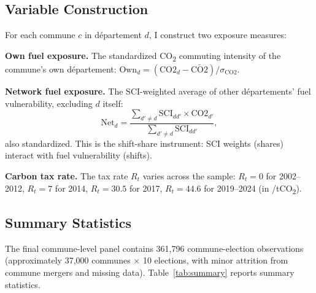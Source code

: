 \documentclass[12pt]{article}
\providecommand{\euro}{\texteuro}
\newcommand{\dept}{d\'{e}partement}
\newcommand{\depts}{d\'{e}partements}
\begin{document}
\subsection{Variable Construction}

For each commune $c$ in \dept{} $d$, I construct two exposure measures:

\textbf{Own fuel exposure.} The standardized CO\textsubscript{2} commuting intensity of the commune's own \dept{}: $\text{Own}_d = (\text{CO2}_d - \bar{\text{CO2}}) / \sigma_{\text{CO2}}$.

\textbf{Network fuel exposure.} The SCI-weighted average of other \depts{}' fuel vulnerability, excluding $d$ itself:
\begin{equation}
\text{Net}_d = \frac{\sum_{d' \neq d} \text{SCI}_{dd'} \times \text{CO2}_{d'}}{\sum_{d' \neq d} \text{SCI}_{dd'}},
\label{eq:network_exposure}
\end{equation}
also standardized. This is the shift-share instrument: SCI weights (shares) interact with fuel vulnerability (shifts).

\textbf{Carbon tax rate.} The tax rate $R_t$ varies across the sample: $R_t = 0$ for 2002--2012, $R_t = 7$ for 2014, $R_t = 30.5$ for 2017, $R_t = 44.6$ for 2019--2024 (in \euro/tCO\textsubscript{2}).

\subsection{Summary Statistics}

The final commune-level panel contains 361,796 commune-election observations (approximately 37,000 communes $\times$ 10 elections, with minor attrition from commune mergers and missing data). Table~\ref{tab:summary} reports summary statistics.
\end{document}
